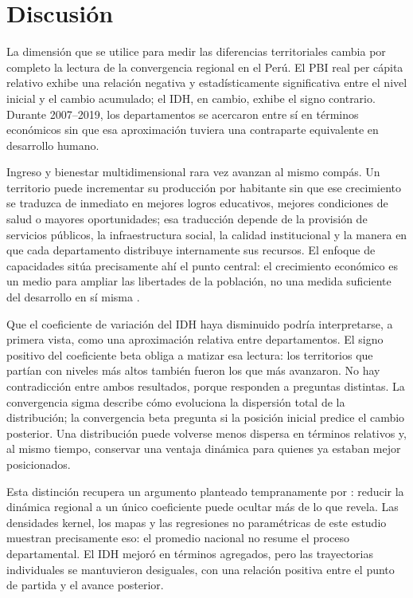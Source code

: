 \section{Discusión}

La dimensión que se utilice para medir las diferencias territoriales cambia
por completo la lectura de la convergencia regional en el Perú. El PBI real
per cápita relativo exhibe una relación negativa y estadísticamente
significativa entre el nivel inicial y el cambio acumulado; el IDH, en
cambio, exhibe el signo contrario. Durante 2007--2019, los departamentos se
acercaron entre sí en términos económicos sin que esa aproximación tuviera
una contraparte equivalente en desarrollo humano.
 
Ingreso y bienestar multidimensional rara vez avanzan al mismo compás. Un
territorio puede incrementar su producción por habitante sin que ese
crecimiento se traduzca de inmediato en mejores logros educativos, mejores
condiciones de salud o mayores oportunidades; esa traducción depende de la
provisión de servicios públicos, la infraestructura social, la calidad
institucional y la manera en que cada departamento distribuye internamente
sus recursos. El enfoque de capacidades sitúa precisamente ahí el punto
central: el crecimiento económico es un medio para ampliar las libertades de
la población, no una medida suficiente del desarrollo en sí misma
\parencite{sen1999}.
 
Que el coeficiente de variación del IDH haya disminuido podría interpretarse,
a primera vista, como una aproximación relativa entre departamentos. El signo
positivo del coeficiente beta obliga a matizar esa lectura: los territorios
que partían con niveles más altos también fueron los que más avanzaron. No
hay contradicción entre ambos resultados, porque responden a preguntas
distintas. La convergencia sigma describe cómo evoluciona la dispersión total
de la distribución; la convergencia beta pregunta si la posición inicial
predice el cambio posterior. Una distribución puede volverse menos dispersa
en términos relativos y, al mismo tiempo, conservar una ventaja dinámica para
quienes ya estaban mejor posicionados.
 
Esta distinción recupera un argumento planteado tempranamente por
\textcite{quah1993}: reducir la dinámica regional a un único coeficiente
puede ocultar más de lo que revela. Las densidades kernel, los mapas y las
regresiones no paramétricas de este estudio muestran precisamente eso: el
promedio nacional no resume el proceso departamental. El IDH mejoró en
términos agregados, pero las trayectorias individuales se mantuvieron
desiguales, con una relación positiva entre el punto de partida y el avance
posterior.
 
